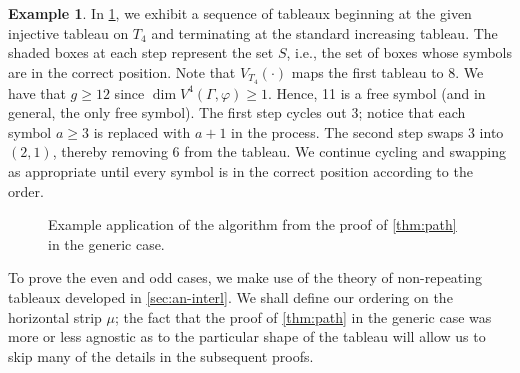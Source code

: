 \documentclass[11pt,reqno]{amsart}
\theoremstyle{definition}
\theoremstyle{problem}
\newtheorem{example}[definition]{Example}
\theoremstyle{plain}
\theoremstyle{remark}
\theoremstyle{theorem}
\numberwithin{equation}{section}
\numberwithin{figure}{section}
\begin{document}
\begin{example}\label{ex:2}
  In \cref{fig:4}, we exhibit a sequence of tableaux beginning at the
  given injective tableau on $T_4$ and terminating at the standard
  increasing tableau. The shaded boxes at each step represent the set
  $S$, i.e., the set of boxes whose symbols are in the correct
  position.  Note that $V_{T_4}(\cdot)$ maps the first tableau to 8.
  We have that $g \geq 12$ since $\dim V^4(\Gamma,\varphi) \geq 1$.
  Hence, 11 is a free symbol (and in general, the only free symbol).
  The first step cycles out 3; notice that each symbol $a \geq 3$ is
  replaced with $a+1$ in the process.  The second step swaps 3 into
  $(2,1)$, thereby removing 6 from the tableau.  We continue cycling
  and swapping as appropriate until every symbol is in the correct
  position according to the order.
  \begin{figure}[htb]
    
    \caption{Example application of the algorithm from the proof of
      \cref{thm:path} in the generic case.}
  \label{fig:4}
  \end{figure}
\end{example}

To prove the even and odd cases, we make use of the theory of
non-repeating tableaux developed in \cref{sec:an-interl}.  We shall
define our ordering on the horizontal strip $\mu$; the fact that the
proof of \cref{thm:path} in the generic case was more or less agnostic
as to the particular shape of the tableau will allow us to skip many
of the details in the subsequent proofs.
\end{document}
